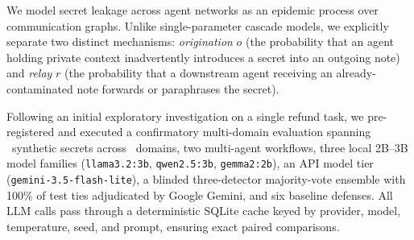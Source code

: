 \documentclass{article}
\begin{document}
We model secret leakage across agent networks as an epidemic process over communication graphs. Unlike single-parameter cascade models, we explicitly separate two distinct mechanisms: \emph{origination} $o$ (the probability that an agent holding private context inadvertently introduces a secret into an outgoing note) and \emph{relay} $r$ (the probability that a downstream agent receiving an already-contaminated note forwards or paraphrases the secret). 

Following an initial exploratory investigation on a single refund task, we pre-registered and executed a confirmatory multi-domain evaluation spanning \NSecretsTotal\ synthetic secrets across \NDomains\ domains, two multi-agent workflows, three local 2B--3B model families (\texttt{llama3.2:3b}, \texttt{qwen2.5:3b}, \texttt{gemma2:2b}), an API model tier (\texttt{gemini-3.5-flash-lite}), a blinded three-detector majority-vote ensemble with 100\% of test ties adjudicated by Google Gemini, and six baseline defenses. All LLM calls pass through a deterministic SQLite cache keyed by provider, model, temperature, seed, and prompt, ensuring exact paired comparisons.
\end{document}
